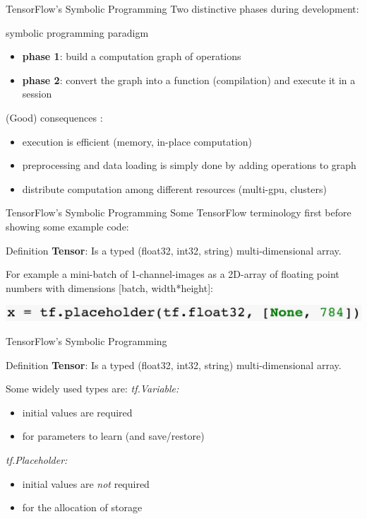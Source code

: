 \documentclass[18pt]{beamer}
\begin{document}
\begin{frame}{TensorFlow's Symbolic Programming}
Two distinctive phases during development:
\begin{block}{symbolic programming paradigm}
\begin{itemize}
\item \textbf{phase 1}: build a computation graph of operations
\item \textbf{phase 2}: convert the graph into a function (compilation) and execute it in a session
\end{itemize}
\end{block}
(Good) consequences :
\begin{itemize}
\item execution is efficient (memory, in-place computation)
\pause
\item preprocessing and data loading is simply done by adding operations to graph
\pause
\item distribute computation among different resources (multi-gpu, clusters)
\end{itemize}
\end{frame}


\begin{frame}{TensorFlow's Symbolic Programming}
Some TensorFlow terminology first before showing some example code:
\begin{block}{Definition}
\textbf{Tensor}: Is a typed (float32, int32, string) multi-dimensional array. 
\end{block}
For example a mini-batch of 1-channel-images as a 2D-array of floating point numbers with dimensions [batch, width*height]:

\begin{center}
\includegraphics[scale=0.3]{figures/tensor.png}
\end{center}
\end{frame}

\begin{frame}{TensorFlow's Symbolic Programming}
\begin{block}{Definition}
\textbf{Tensor}: Is a typed (float32, int32, string) multi-dimensional array. 
\end{block}
Some widely used types are:
\emph{tf.Variable:}
\begin{itemize}
\item initial values are required
\item for parameters to learn (and save/restore)
\end{itemize}
\emph{tf.Placeholder:}
\begin{itemize}
\item initial values are \emph{not} required
\item for the allocation of storage
\end{itemize}

\end{frame}
\end{document}
